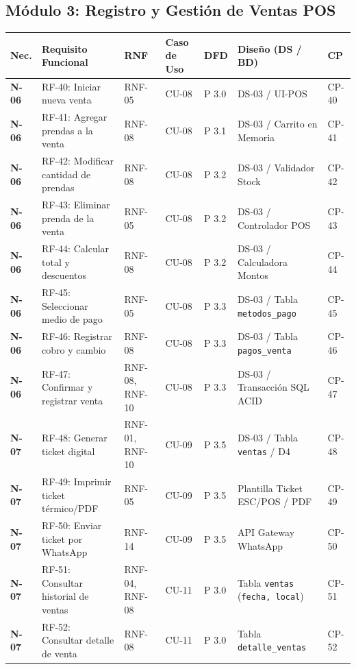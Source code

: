 \subsection{M\'odulo 3: Registro y Gesti\'on de Ventas POS}
\begin{table}[H]
\centering\scriptsize
\begin{tabularx}{\textwidth}{>{\centering\bfseries}p{1.2cm} Y >{\centering\arraybackslash}p{2.0cm} >{\centering\arraybackslash}p{1.5cm} >{\centering\arraybackslash}p{1.0cm} >{\raggedright\arraybackslash}p{3.0cm} >{\centering\arraybackslash}p{1.2cm}}
\toprule
\textbf{Nec.} & \textbf{Requisito Funcional} & \textbf{RNF} & \textbf{Caso de Uso} & \textbf{DFD} & \textbf{Dise\~no (DS / BD)} & \textbf{CP} \\
\midrule
N-06 & RF-40: Iniciar nueva venta & RNF-05 & CU-08 & P 3.0 & DS-03 / UI-POS & CP-40 \\
N-06 & RF-41: Agregar prendas a la venta & RNF-08 & CU-08 & P 3.1 & DS-03 / Carrito en Memoria & CP-41 \\
N-06 & RF-42: Modificar cantidad de prendas & RNF-08 & CU-08 & P 3.2 & DS-03 / Validador Stock & CP-42 \\
N-06 & RF-43: Eliminar prenda de la venta & RNF-05 & CU-08 & P 3.2 & DS-03 / Controlador POS & CP-43 \\
N-06 & RF-44: Calcular total y descuentos & RNF-08 & CU-08 & P 3.2 & DS-03 / Calculadora Montos & CP-44 \\
N-06 & RF-45: Seleccionar medio de pago & RNF-05 & CU-08 & P 3.3 & DS-03 / Tabla \texttt{metodos\_pago} & CP-45 \\
N-06 & RF-46: Registrar cobro y cambio & RNF-08 & CU-08 & P 3.3 & DS-03 / Tabla \texttt{pagos\_venta} & CP-46 \\
N-06 & RF-47: Confirmar y registrar venta & RNF-08, RNF-10 & CU-08 & P 3.3 & DS-03 / Transacci\'on SQL ACID & CP-47 \\
N-07 & RF-48: Generar ticket digital & RNF-01, RNF-10 & CU-09 & P 3.5 & DS-03 / Tabla \texttt{ventas} / D4 & CP-48 \\
N-07 & RF-49: Imprimir ticket t\'ermico/PDF & RNF-05 & CU-09 & P 3.5 & Plantilla Ticket ESC/POS / PDF & CP-49 \\
N-07 & RF-50: Enviar ticket por WhatsApp & RNF-14 & CU-09 & P 3.5 & API Gateway WhatsApp & CP-50 \\
N-07 & RF-51: Consultar historial de ventas & RNF-04, RNF-08 & CU-11 & P 3.0 & Tabla \texttt{ventas} (\texttt{fecha, local}) & CP-51 \\
N-07 & RF-52: Consultar detalle de venta & RNF-08 & CU-11 & P 3.0 & Tabla \texttt{detalle\_ventas} & CP-52 \\

\end{tabularx}
\end{table}
